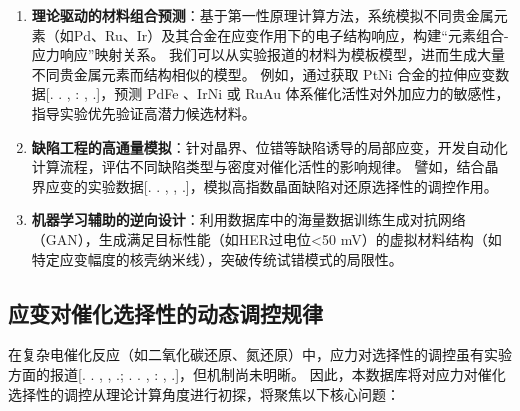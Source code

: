 \begin{enumerate}
	\item
	      \textbf{理论驱动的材料组合预测}：基于第一性原理计算方法，系统模拟不同贵金属元素（如Pd、Ru、Ir）及其合金在应变作用下的电子结构响应，构建``元素组合-应力响应''映射关系。
		  我们可以从实验报道的材料为模板模型，进而生成大量不同贵金属元素而结构相似的模型。
		  例如，通过获取 PtNi 合金的拉伸应变数据[\@. \@. \@, \thinspace{}\textnormal{:
	      }\@, \@.]，预测 PdFe 、IrNi 或 RuAu 体系催化活性对外加应力的敏感性，指导实验优先验证高潜力候选材料。
	\item
	      \textbf{缺陷工程的高通量模拟}：针对晶界、位错等缺陷诱导的局部应变，开发自动化计算流程，评估不同缺陷类型与密度对催化活性的影响规律。
	      譬如，结合晶界应变的实验数据[\@. \@. \@,
	      \@, \@.]，模拟高指数晶面缺陷对还原选择性的调控作用。
	\item
	      \textbf{机器学习辅助的逆向设计}：利用数据库中的海量数据训练生成对抗网络（GAN），生成满足目标性能（如HER过电位\textless50
	      mV）的虚拟材料结构（如特定应变幅度的核壳纳米线），突破传统试错模式的局限性。
\end{enumerate}

\subsection{应变对催化选择性的动态调控规律}
在复杂电催化反应（如二氧化碳还原、氮还原）中，应力对选择性的调控虽有实验方面的报道[\@. \@. \@,
	\@, \@.; \@. \@. \@,
	\thinspace{}\textnormal{:
	}\@, \@.]，但机制尚未明晰。
因此，本数据库将对应力对催化选择性的调控从理论计算角度进行初探，将聚焦以下核心问题：


